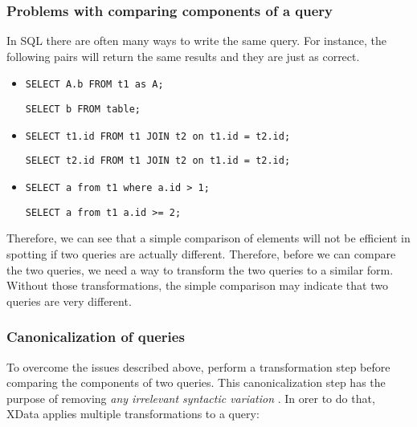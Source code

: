 \subsubsection{Problems with comparing components of a query}

In SQL there are often many ways to write the same query.
For instance, the following pairs will return the same results and they are
just as correct.

\begin{itemize}
  \item \texttt{SELECT A.b FROM t1 as A;}

  \texttt{SELECT b FROM table;}
  \item \texttt{SELECT t1.id FROM t1 JOIN t2 on t1.id = t2.id;}

  \texttt{SELECT t2.id FROM t1 JOIN t2 on t1.id = t2.id;}
  \item \texttt{SELECT a from t1 where a.id > 1;}

  \texttt{SELECT a from t1 a.id >= 2;}
\end{itemize}

Therefore, we can see that a simple comparison of elements will not be efficient in spotting if two queries are actually different. Therefore, before we can compare the two queries, we need a way to transform the two queries to a similar form. Without those transformations, the simple comparison may indicate
that two queries are very different.

\subsubsection{Canonicalization of queries} \label{ch:lit:sec:canonicalization}

To overcome the issues described above, \cite{literature:xdata} perform a transformation step before comparing the components of two queries. This canonicalization step has the purpose of removing \textit{any irrelevant syntactic variation} \citep{literature:xdata}. In orer to do that, XData applies multiple transformations to a query:

